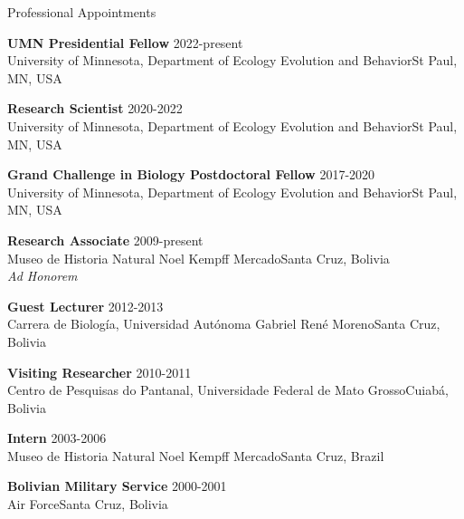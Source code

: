 \documentclass{resume} %
\begin{document}
\begin{rSection}{Professional Appointments}

{\bf UMN Presidential Fellow} \hfill {2022-present} \\
{University of Minnesota, Department of Ecology Evolution and Behavior}\hfill {St Paul, MN, USA}

{\bf Research Scientist} \hfill {2020-2022} \\
{University of Minnesota, Department of Ecology Evolution and Behavior}\hfill {St Paul, MN, USA} 

{\bf Grand Challenge in Biology Postdoctoral Fellow} \hfill {2017-2020} \\
{University of Minnesota, Department of Ecology Evolution and Behavior}\hfill {St Paul, MN, USA} 

{\bf Research Associate} \hfill {2009-present} \\
{Museo de Historia Natural Noel Kempff Mercado}\hfill {Santa Cruz, Bolivia} \\
\emph{Ad Honorem} 

{\bf Guest Lecturer} \hfill {2012-2013} \\
{Carrera de Biología, Universidad Autónoma Gabriel René Moreno}\hfill {Santa Cruz, Bolivia} 

{\bf Visiting Researcher} \hfill {2010-2011} \\
{Centro de Pesquisas do Pantanal, Universidade Federal de Mato Grosso}\hfill {Cuiabá, Bolivia} 

{\bf Intern} \hfill {2003-2006} \\
{Museo de Historia Natural Noel Kempff Mercado}\hfill {Santa Cruz, Brazil} 

{\bf Bolivian Military Service} \hfill {2000-2001} \\
{Air Force}\hfill {Santa Cruz, Bolivia} 
\end{rSection}

\clearpage

\end{document}
